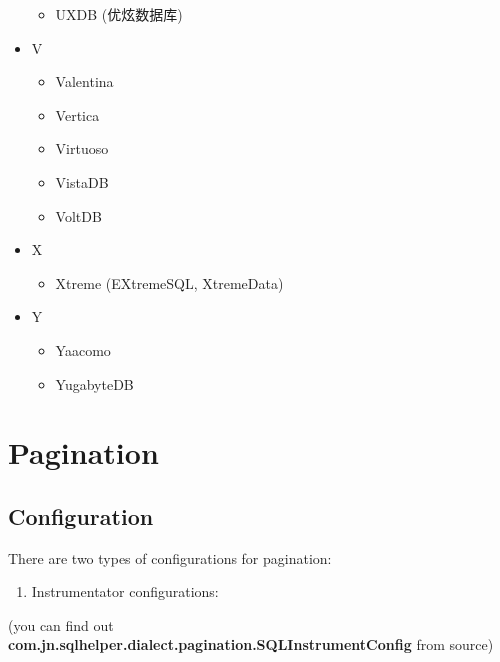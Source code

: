 \documentclass[
]{book}
\providecommand{\tightlist}{%
  \setlength{\itemsep}{0pt}\setlength{\parskip}{0pt}}
\begin{document}
\begin{itemize}
  \begin{itemize}
  \tightlist
  \item
    UXDB (优炫数据库)
  \end{itemize}
\item
  V

  \begin{itemize}
  \tightlist
  \item
    Valentina
  \item
    Vertica
  \item
    Virtuoso
  \item
    VistaDB
  \item
    VoltDB
  \end{itemize}
\item
  X

  \begin{itemize}
  \tightlist
  \item
    Xtreme (EXtremeSQL, XtremeData)
  \end{itemize}
\item
  Y

  \begin{itemize}
  \tightlist
  \item
    Yaacomo
  \item
    YugabyteDB
  \end{itemize}
\end{itemize}

\hypertarget{sqlhelper_pagination}{%
\chapter{Pagination}\label{sqlhelper_pagination}}

\hypertarget{pagination_configuration}{%
\section{Configuration}\label{pagination_configuration}}

There are two types of configurations for pagination:

\begin{enumerate}
\def\labelenumi{\arabic{enumi})}
\tightlist
\item
  Instrumentator configurations:
\end{enumerate}

(you can find out \textbf{com.jn.sqlhelper.dialect.pagination.SQLInstrumentConfig} from source)
\end{document}
